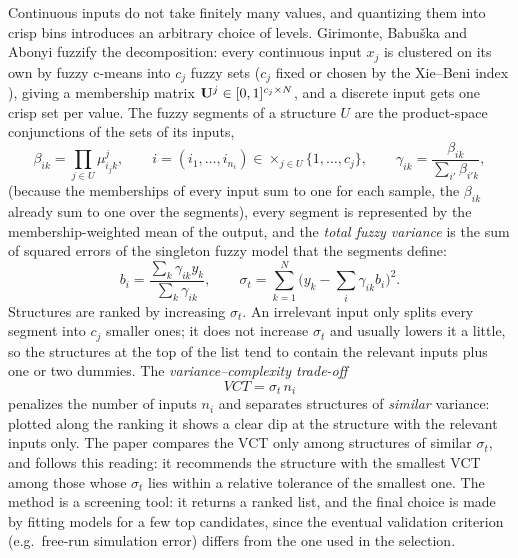 Continuous inputs do not take finitely many values, and quantizing them into crisp bins introduces an arbitrary choice of levels. Girimonte, Babu\v{s}ka and Abonyi \cite{girimonte:2004:structure} fuzzify the decomposition: every continuous input $x_j$ is clustered on its own by fuzzy c-means into $c_j$ fuzzy sets ($c_j$ fixed or chosen by the Xie--Beni index \cite{xie:1991:validity}), giving a membership matrix $\mathbf{U}^j\in[0,1]^{c_j\times N}$, and a discrete input gets one crisp set per value. The fuzzy segments of a structure $U$ are the product-space conjunctions of the sets of its inputs,
\begin{equation}
  \beta_{ik}=\prod_{j\in U}\mu^{j}_{i_jk},\qquad i=(i_1,\dots,i_{n_i})\in\times_{j\in U}\{1,\dots,c_j\},\qquad
  \gamma_{ik}=\frac{\beta_{ik}}{\sum_{i'}\beta_{i'k}},
  \label{eq:ts:segments}
\end{equation}
(because the memberships of every input sum to one for each sample, the $\beta_{ik}$ already sum to one over the segments), every segment is represented by the membership-weighted mean of the output, and the \emph{total fuzzy variance} is the sum of squared errors of the singleton fuzzy model that the segments define:
\begin{equation}
  b_i=\frac{\sum_k\gamma_{ik}y_k}{\sum_k\gamma_{ik}},\qquad
  \sigma_t=\sum_{k=1}^{N}\Big(y_k-\sum_{i}\gamma_{ik}b_i\Big)^2.
  \label{eq:ts:sigmat}
\end{equation}
Structures are ranked by increasing $\sigma_t$. An irrelevant input only splits every segment into $c_j$ smaller ones; it does not increase $\sigma_t$ and usually lowers it a little, so the structures at the top of the list tend to contain the relevant inputs plus one or two dummies. The \emph{variance--complexity trade-off}
\begin{equation}
  VCT=\sigma_t\,n_i
  \label{eq:ts:vct}
\end{equation}
penalizes the number of inputs $n_i$ and separates structures of \emph{similar} variance: plotted along the ranking it shows a clear dip at the structure with the relevant inputs only. The paper compares the VCT only among structures of similar $\sigma_t$, and  follows this reading: it recommends the structure with the smallest VCT among those whose $\sigma_t$ lies within a relative tolerance of the smallest one. The method is a screening tool: it returns a ranked list, and the final choice is made by fitting models for a few top candidates, since the eventual validation criterion (e.g.\ free-run simulation error) differs from the one used in the selection.

